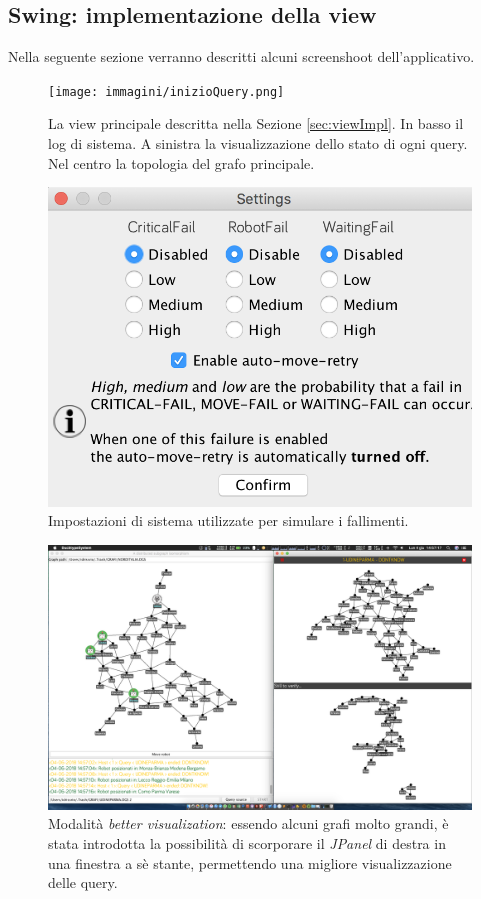 \subsection{Swing: implementazione della view}
\label{sec:view}
Nella seguente sezione verranno descritti alcuni screenshoot dell'applicativo.
\begin{figure}
\hspace{-2.5cm}
\texttt{[image: immagini/inizioQuery.png]}
\caption{La view principale descritta nella Sezione \ref{sec:viewImpl}.
In basso il log di sistema. A sinistra la visualizzazione dello stato di ogni query.
Nel centro la topologia del grafo principale.}
\end{figure}
\begin{figure}
	\centering
	\includegraphics[scale=0.25]{immagini/settings.png}
	\caption{Impostazioni di sistema utilizzate per simulare i fallimenti.}
\end{figure}
\begin{figure}
	\hspace{-2.5cm}
	\includegraphics[scale=0.3]{immagini/betterVisualization.png}
	\caption{Modalità \emph{better visualization}: essendo alcuni grafi molto grandi, è stata introdotta la possibilità di scorporare il \emph{JPanel} di destra in una finestra a sè stante, permettendo una migliore visualizzazione delle query.}
\end{figure}
\newpage

